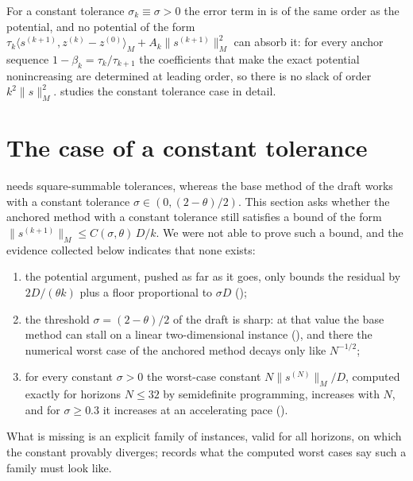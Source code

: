 \begin{remark}\label{rem:acc-fixed-sigma}
    For a constant tolerance $\sigma_k \equiv \sigma > 0$ the error term in  is of the same order as the potential, and no potential of the form $\tau_k\langle s^{(k+1)}, z^{(k)} - z^{(0)}\rangle_M + A_k\|s^{(k+1)}\|_M^2$ can absorb it: for every anchor sequence $1 - \beta_k = \tau_k/\tau_{k+1}$ the coefficients that make the exact potential nonincreasing are determined at leading order, so there is no slack of order $k^2\|s\|_M^2$.
     studies the constant tolerance case in detail.
\end{remark}

\section{The case of a constant tolerance}\label{sec:acc-constant}
 needs square-summable tolerances, whereas the base method of the draft works with a constant tolerance $\sigma \in (0, (2-\theta)/2)$.
This section asks whether the anchored method with a constant tolerance still satisfies a bound of the form $\|s^{(k+1)}\|_M \le C(\sigma,\theta)\,D/k$.
We were not able to prove such a bound, and the evidence collected below indicates that none exists:
\begin{enumerate}
    \item the potential argument, pushed as far as it goes, only bounds the residual by $2D/(\theta k)$ plus a floor proportional to $\sigma D$ ();
    \item the threshold $\sigma = (2-\theta)/2$ of the draft is sharp: at that value the base method can stall on a linear two-dimensional instance (), and there the numerical worst case of the anchored method decays only like $N^{-1/2}$;
    \item for every constant $\sigma > 0$ the worst-case constant $N\|s^{(N)}\|_M/D$, computed exactly for horizons $N \le 32$ by semidefinite programming, increases with $N$, and for $\sigma \ge 0.3$ it increases at an accelerating pace ().
\end{enumerate}
What is missing is an explicit family of instances, valid for all horizons, on which the constant provably diverges;  records what the computed worst cases say such a family must look like.

